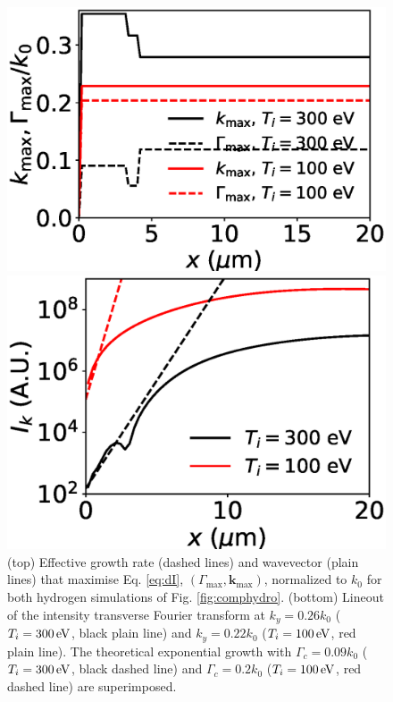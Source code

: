 \documentclass[
 reprint,
 superscriptaddress,
 amsmath,amssymb,
 aps,
]{revtex4-1}
\begin{document}
\begin{figure}

\includegraphics[width=0.99\columnwidth]{comp_kmax_gmax.eps}

\includegraphics[width=0.99\columnwidth]{gmax_eff.eps}

\caption{ \label{fig:geff} 
(top) Effective growth rate (dashed lines) and wavevector (plain lines) that maximise Eq.  \eqref{eq:dI}, $(\Gamma_\mathrm{max},\mathbf{k}_\mathrm{max})$,  normalized to $k_0$ for both hydrogen simulations of Fig. \ref{fig:comphydro}.
(bottom) Lineout of the intensity transverse Fourier transform at $k_y = 0.26k_0$ ($T_i=300\, \rm eV$, black plain line)  and $k_y = 0.22k_0$ ($T_i=100\, \rm eV$, red plain line). The theoretical exponential growth with $\Gamma_c=0.09k_0$ ($T_i=300\, \rm eV$, black dashed line) and $\Gamma_c=0.2k_0$ ($T_i=100\, \rm eV$, red dashed line) are superimposed. 
}
\end{figure}
\end{document}
